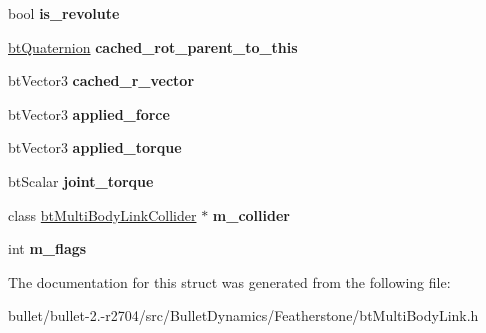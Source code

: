 \begin{DoxyCompactItemize}
\item 
\hypertarget{structbt_multibody_link_a317e765bc486a882fa9e7d6dd9a8747d}{bool {\bfseries is\+\_\+revolute}}\label{structbt_multibody_link_a317e765bc486a882fa9e7d6dd9a8747d}

\item 
\hypertarget{structbt_multibody_link_ae72e6666815fb04a05b2f76565045a0c}{\hyperlink{classbt_quaternion}{bt\+Quaternion} {\bfseries cached\+\_\+rot\+\_\+parent\+\_\+to\+\_\+this}}\label{structbt_multibody_link_ae72e6666815fb04a05b2f76565045a0c}

\item 
\hypertarget{structbt_multibody_link_a8b2234e6c200f8640b36d8ad3e075b60}{bt\+Vector3 {\bfseries cached\+\_\+r\+\_\+vector}}\label{structbt_multibody_link_a8b2234e6c200f8640b36d8ad3e075b60}

\item 
\hypertarget{structbt_multibody_link_a47fef0b2dc0a0c42d2ad386dda76d2d0}{bt\+Vector3 {\bfseries applied\+\_\+force}}\label{structbt_multibody_link_a47fef0b2dc0a0c42d2ad386dda76d2d0}

\item 
\hypertarget{structbt_multibody_link_afb9b26849d22fadb60a432161ab51a92}{bt\+Vector3 {\bfseries applied\+\_\+torque}}\label{structbt_multibody_link_afb9b26849d22fadb60a432161ab51a92}

\item 
\hypertarget{structbt_multibody_link_a0450a199f913f2995f345d7c3be2ebc0}{bt\+Scalar {\bfseries joint\+\_\+torque}}\label{structbt_multibody_link_a0450a199f913f2995f345d7c3be2ebc0}

\item 
\hypertarget{structbt_multibody_link_a1a1490ac2130a237ac60872b7d8f8103}{class \hyperlink{classbt_multi_body_link_collider}{bt\+Multi\+Body\+Link\+Collider} $\ast$ {\bfseries m\+\_\+collider}}\label{structbt_multibody_link_a1a1490ac2130a237ac60872b7d8f8103}

\item 
\hypertarget{structbt_multibody_link_a8ba5d13f52212ec334dbb5c4d4484cff}{int {\bfseries m\+\_\+flags}}\label{structbt_multibody_link_a8ba5d13f52212ec334dbb5c4d4484cff}

\end{DoxyCompactItemize}


The documentation for this struct was generated from the following file\+:\begin{DoxyCompactItemize}
\item 
bullet/bullet-\/2.-\/r2704/src/\+Bullet\+Dynamics/\+Featherstone/bt\+Multi\+Body\+Link.\+h\end{DoxyCompactItemize}
